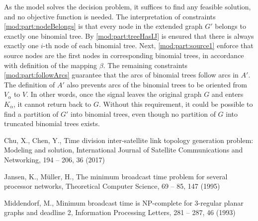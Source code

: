 As the model solves the decision problem, it suffices to find any feasible solution, and no objective function is needed.
The interpretation of constraints \eqref{mod:part:nodeBelongs} is that every node in the extended graph $G'$ belongs to exactly one binomial tree.
By \eqref{mod:part:treeHasIJ} is ensured that there is always exactly one $i$-th node of each binomial tree.
Next, \eqref{mod:part:source1} enforce that source nodes are the first nodes in corresponding binomial trees, in accordance with definition of the mapping $\beta$.
The remaining constraints \eqref{mod:part:followArcs} guarantee that the arcs of binomial trees follow arcs in $A'$.
The definition of $A'$ also prevents arcs of the binomial trees to be oriented from $V_\alpha$ to $V$.
In other words, once the signal leaves the original graph $G$ and enters $K_\alpha$, it cannot return back to $G$.
Without this requirement, it could be possible to find a partition of $G'$ into binomial trees, even though no partition of $G$ into truncated binomial trees exists.



\begin{thebibliography}{}
%
%
Chu, X., Chen, Y.,
Time division inter‐satellite link topology generation problem: Modeling and solution,
International Journal of Satellite Communications and Networking, 194 -- 206, 36 (2017)

Jansen, K., M\"uller, H.,
The minimum broadcast time problem for several processor networks, 
Theoretical Computer Science, 69 -- 85, 147 (1995)

Middendorf, M.,
Minimum broadcast time is NP-complete for 3-regular planar graphs and deadline 2,
Information Processing Letters, 281 -- 287, 46 (1993)

\end{thebibliography}



